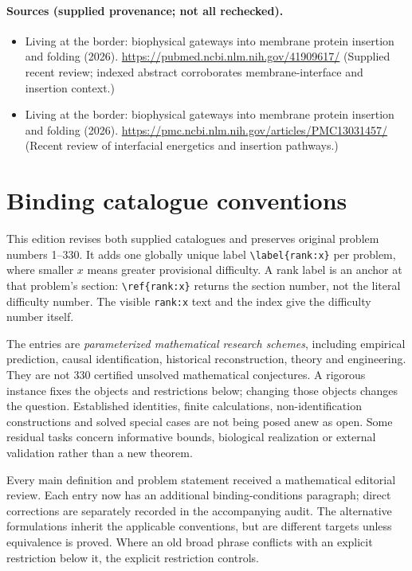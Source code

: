 \documentclass[11pt]{article}
\begin{document}
\paragraph{Sources (supplied provenance; not all rechecked).}
\begin{itemize}
\item Living at the border: biophysical gateways into membrane protein insertion and folding (2026). \url{https://pubmed.ncbi.nlm.nih.gov/41909617/} (Supplied recent review; indexed abstract corroborates membrane-interface and insertion context.)
\item Living at the border: biophysical gateways into membrane protein insertion and folding (2026). \url{https://pmc.ncbi.nlm.nih.gov/articles/PMC13031457/} (Recent review of interfacial energetics and insertion pathways.)
\end{itemize}


\section*{Binding catalogue conventions}
This edition revises both supplied catalogues and preserves original problem numbers 1--330. It adds one globally unique label \verb|\label{rank:x}| per problem, where smaller $x$ means greater provisional difficulty. A rank label is an anchor at that problem's section: \verb|\ref{rank:x}| returns the section number, not the literal difficulty number. The visible \texttt{rank:x} text and the index give the difficulty number itself.

The entries are \emph{parameterized mathematical research schemes}, including empirical prediction, causal identification, historical reconstruction, theory and engineering. They are not 330 certified unsolved mathematical conjectures. A rigorous instance fixes the objects and restrictions below; changing those objects changes the question. Established identities, finite calculations, non-identification constructions and solved special cases are not being posed anew as open. Some residual tasks concern informative bounds, biological realization or external validation rather than a new theorem.

Every main definition and problem statement received a mathematical editorial review. Each entry now has an additional binding-conditions paragraph; direct corrections are separately recorded in the accompanying audit. The alternative formulations inherit the applicable conventions, but are different targets unless equivalence is proved. Where an old broad phrase conflicts with an explicit restriction below it, the explicit restriction controls.
\end{document}
